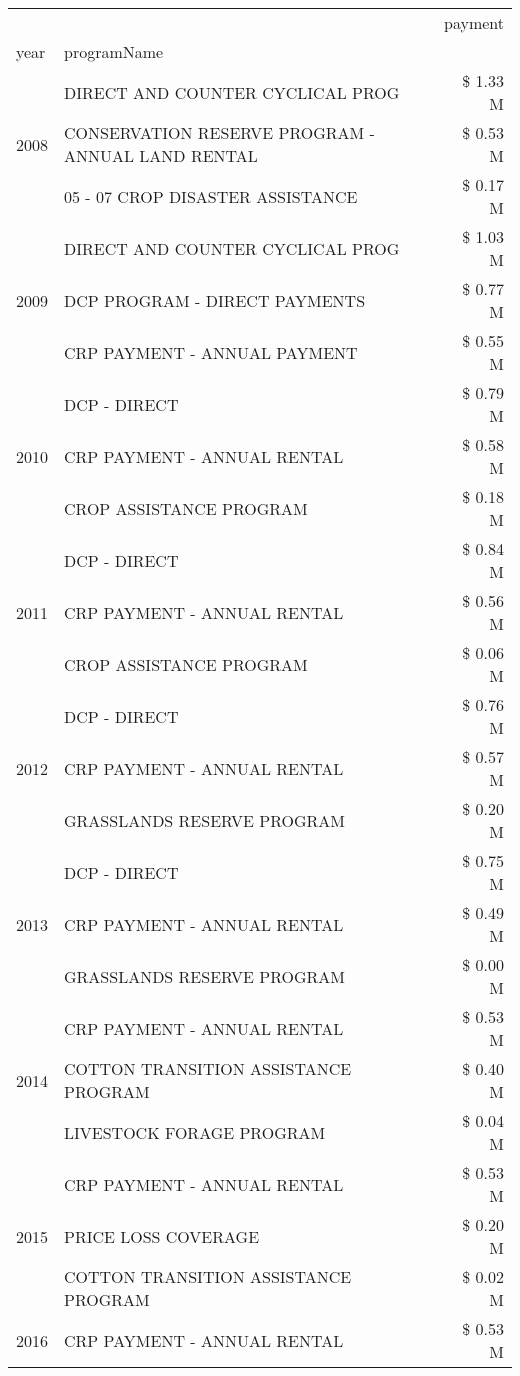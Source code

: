 \begin{tabular}{llr}
\toprule
 &  & payment \\
year & programName &  \\
\midrule
\multirow[t]{3}{*}{2008} & DIRECT AND COUNTER CYCLICAL PROG & \$ 1.33 M \\
 & CONSERVATION RESERVE PROGRAM - ANNUAL LAND RENTAL & \$ 0.53 M \\
 & 05 - 07 CROP DISASTER ASSISTANCE & \$ 0.17 M \\
\cline{1-3}
\multirow[t]{3}{*}{2009} & DIRECT AND COUNTER CYCLICAL PROG & \$ 1.03 M \\
 & DCP PROGRAM - DIRECT PAYMENTS & \$ 0.77 M \\
 & CRP PAYMENT - ANNUAL PAYMENT & \$ 0.55 M \\
\cline{1-3}
\multirow[t]{3}{*}{2010} & DCP - DIRECT & \$ 0.79 M \\
 & CRP PAYMENT - ANNUAL RENTAL & \$ 0.58 M \\
 & CROP ASSISTANCE PROGRAM & \$ 0.18 M \\
\cline{1-3}
\multirow[t]{3}{*}{2011} & DCP - DIRECT & \$ 0.84 M \\
 & CRP PAYMENT - ANNUAL RENTAL & \$ 0.56 M \\
 & CROP ASSISTANCE PROGRAM & \$ 0.06 M \\
\cline{1-3}
\multirow[t]{3}{*}{2012} & DCP - DIRECT & \$ 0.76 M \\
 & CRP PAYMENT - ANNUAL RENTAL & \$ 0.57 M \\
 & GRASSLANDS RESERVE PROGRAM & \$ 0.20 M \\
\cline{1-3}
\multirow[t]{3}{*}{2013} & DCP - DIRECT & \$ 0.75 M \\
 & CRP PAYMENT - ANNUAL RENTAL & \$ 0.49 M \\
 & GRASSLANDS RESERVE PROGRAM & \$ 0.00 M \\
\cline{1-3}
\multirow[t]{3}{*}{2014} & CRP PAYMENT - ANNUAL RENTAL & \$ 0.53 M \\
 & COTTON TRANSITION ASSISTANCE PROGRAM & \$ 0.40 M \\
 & LIVESTOCK FORAGE PROGRAM & \$ 0.04 M \\
\cline{1-3}
\multirow[t]{3}{*}{2015} & CRP PAYMENT - ANNUAL RENTAL & \$ 0.53 M \\
 & PRICE LOSS COVERAGE & \$ 0.20 M \\
 & COTTON TRANSITION ASSISTANCE PROGRAM & \$ 0.02 M \\
\cline{1-3}
\multirow[t]{3}{*}{2016} & CRP PAYMENT - ANNUAL RENTAL & \$ 0.53 M \\

\end{tabular}
